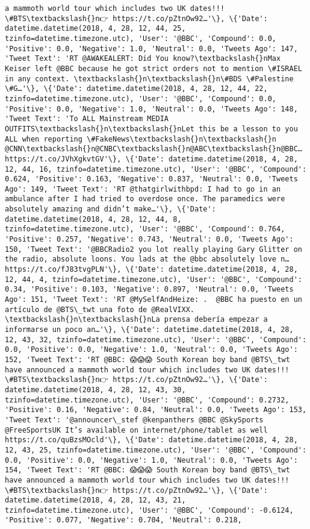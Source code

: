 \documentclass[11pt]{article}
\begin{document}
\begin{Verbatim}[commandchars=\\\{\}]
a mammoth world tour which includes two UK dates!!! \#BTS\textbackslash{}n👉 https://t.co/pZtnOw92…'\}, \{'Date': datetime.datetime(2018, 4, 28, 12, 44, 25, tzinfo=datetime.timezone.utc), 'User': '@BBC', 'Compound': 0.0, 'Positive': 0.0, 'Negative': 1.0, 'Neutral': 0.0, 'Tweets Ago': 147, 'Tweet Text': 'RT @AWAKEALERT: Did You know?\textbackslash{}nMax Keiser left @BBC because he got strict orders not to mention \#ISRAEL in any context. \textbackslash{}n\textbackslash{}n\#BDS \#Palestine \#G…'\}, \{'Date': datetime.datetime(2018, 4, 28, 12, 44, 22, tzinfo=datetime.timezone.utc), 'User': '@BBC', 'Compound': 0.0, 'Positive': 0.0, 'Negative': 1.0, 'Neutral': 0.0, 'Tweets Ago': 148, 'Tweet Text': 'To ALL Mainstream MEDIA OUTFITS\textbackslash{}n\textbackslash{}nLet this be a lesson to you ALL when reporting \#FakeNews\textbackslash{}n\textbackslash{}n @CNN\textbackslash{}n@CNBC\textbackslash{}n@ABC\textbackslash{}n@BBC… https://t.co/JVhXgkvtGV'\}, \{'Date': datetime.datetime(2018, 4, 28, 12, 44, 16, tzinfo=datetime.timezone.utc), 'User': '@BBC', 'Compound': 0.624, 'Positive': 0.163, 'Negative': 0.837, 'Neutral': 0.0, 'Tweets Ago': 149, 'Tweet Text': 'RT @thatgirlwithbpd: I had to go in an ambulance after I had tried to overdose once. The paramedics were absolutely amazing and didn’t make…'\}, \{'Date': datetime.datetime(2018, 4, 28, 12, 44, 8, tzinfo=datetime.timezone.utc), 'User': '@BBC', 'Compound': 0.764, 'Positive': 0.257, 'Negative': 0.743, 'Neutral': 0.0, 'Tweets Ago': 150, 'Tweet Text': '@BBCRadio2 you lot really playing Gary Glitter on the radio, absolute loons. You lads at the @bbc absolutely love n… https://t.co/fJ83tvgPLN'\}, \{'Date': datetime.datetime(2018, 4, 28, 12, 44, 4, tzinfo=datetime.timezone.utc), 'User': '@BBC', 'Compound': 0.34, 'Positive': 0.103, 'Negative': 0.897, 'Neutral': 0.0, 'Tweets Ago': 151, 'Tweet Text': 'RT @MySelfAndHeize: .  @BBC ha puesto en un artículo de @BTS\_twt una foto de @RealVIXX. \textbackslash{}n\textbackslash{}nLa prensa debería empezar a informarse un poco an…'\}, \{'Date': datetime.datetime(2018, 4, 28, 12, 43, 32, tzinfo=datetime.timezone.utc), 'User': '@BBC', 'Compound': 0.0, 'Positive': 0.0, 'Negative': 1.0, 'Neutral': 0.0, 'Tweets Ago': 152, 'Tweet Text': 'RT @BBC: 😱😱😱 South Korean boy band @BTS\_twt have announced a mammoth world tour which includes two UK dates!!! \#BTS\textbackslash{}n👉 https://t.co/pZtnOw92…'\}, \{'Date': datetime.datetime(2018, 4, 28, 12, 43, 30, tzinfo=datetime.timezone.utc), 'User': '@BBC', 'Compound': 0.2732, 'Positive': 0.16, 'Negative': 0.84, 'Neutral': 0.0, 'Tweets Ago': 153, 'Tweet Text': '@announcer\_stef @kenpanthers @BBC @SkySports @FreeSportsUK It’s available on internet/phone/tablet as well  https://t.co/quBzsMOcld'\}, \{'Date': datetime.datetime(2018, 4, 28, 12, 43, 25, tzinfo=datetime.timezone.utc), 'User': '@BBC', 'Compound': 0.0, 'Positive': 0.0, 'Negative': 1.0, 'Neutral': 0.0, 'Tweets Ago': 154, 'Tweet Text': 'RT @BBC: 😱😱😱 South Korean boy band @BTS\_twt have announced a mammoth world tour which includes two UK dates!!! \#BTS\textbackslash{}n👉 https://t.co/pZtnOw92…'\}, \{'Date': datetime.datetime(2018, 4, 28, 12, 43, 21, tzinfo=datetime.timezone.utc), 'User': '@BBC', 'Compound': -0.6124, 'Positive': 0.077, 'Negative': 0.704, 'Neutral': 0.218, 
\end{Verbatim}
\end{document}

